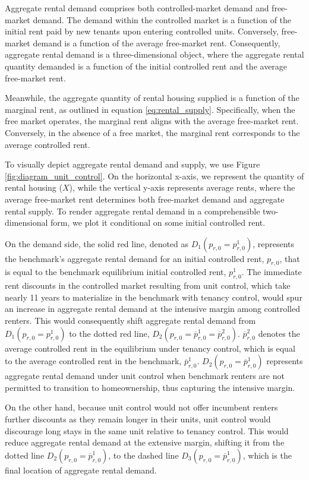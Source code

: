 \documentclass[parskip=full]{article}
\begin{document}
Aggregate rental demand comprises both controlled-market demand and free-market demand. The demand within the controlled market is a function of the initial rent paid by new tenants upon entering controlled units. Conversely, free-market demand is a function of the average free-market rent. Consequently, aggregate rental demand is a three-dimensional object, where the aggregate rental quantity demanded is a function of the initial controlled rent and the average free-market rent.

Meanwhile, the aggregate quantity of rental housing supplied is a function of the marginal rent, as outlined in equation \eqref{eq:rental_supply}. Specifically, when the free market operates, the marginal rent aligns with the average free-market rent. Conversely, in the absence of a free market, the marginal rent corresponds to the average controlled rent.

To visually depict aggregate rental demand and supply, we use Figure \ref{fig:diagram_unit_control}. On the horizontal x-axis, we represent the quantity of rental housing ($X$), while the vertical y-axis represents average rents, where the average free-market rent determines both free-market demand and aggregate rental supply. To render aggregate rental demand in a comprehensible two-dimensional form, we plot it conditional on some initial controlled rent.

On the demand side, the solid red line, denoted as $D_{1}(p_{r,0}=p^{1}_{r,0})$, represents the benchmark's aggregate rental demand for an initial controlled rent, $p_{r,0}$, that is equal to the benchmark equilibrium initial controlled rent, $p^{1}_{r,0}$. The immediate rent discounts in the controlled market resulting from unit control, which take nearly 11 years to materialize in the benchmark with tenancy control, would spur an increase in aggregate rental demand at the intensive margin among controlled renters. This would consequently shift aggregate rental demand from $D_{1}(p_{r,0}=p^{1}_{r,0})$ to the dotted red line, $D_{2}(p_{r,0}=\overline{p}^{1}_{r,0}=\overline{p}^{2}_{r,0})$. $\overline{p}^{2}_{r,0}$ denotes the average controlled rent in the equilibrium under tenancy control, which is equal to the average controlled rent in the benchmark, $\overline{p}^{1}_{r,0}$. $D_{2}(p_{r,0}=\overline{p}^{1}_{r,0})$ represents aggregate rental demand under unit control when benchmark renters are not permitted to transition to homeownership, thus capturing the intensive margin. 

On the other hand, because unit control would not offer incumbent renters further discounts as they remain longer in their units, unit control would discourage long stays in the same unit relative to tenancy control. This would reduce aggregate rental demand at the extensive margin, shifting it from the dotted line $D_{2}(p_{r,0}=\overline{p}^{1}_{r,0})$, to the dashed line $D_{3}(p_{r,0}=\overline{p}^{1}_{r,0})$, which is the final location of aggregate rental demand.  
\end{document}
